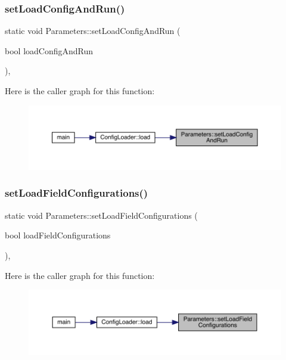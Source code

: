 \subsubsection{\texorpdfstring{setLoadConfigAndRun()}{setLoadConfigAndRun()}}
{\footnotesize\ttfamily static void Parameters\+::set\+Load\+Config\+And\+Run (\begin{DoxyParamCaption}\item[{bool}]{load\+Config\+And\+Run }\end{DoxyParamCaption})\hspace{0.3cm}{\ttfamily [inline]}, {\ttfamily [static]}}

Here is the caller graph for this function\+:
\nopagebreak
\begin{figure}[H]
\begin{center}
\leavevmode
\includegraphics[width=350pt]{class_parameters_aa7e911174ec1991f6750b9774b184fd3_icgraph}
\end{center}
\end{figure}
\mbox{\label{class_parameters_a4f96947340b496b847a808b8be6fc5f9}} 
\subsubsection{\texorpdfstring{setLoadFieldConfigurations()}{setLoadFieldConfigurations()}}
{\footnotesize\ttfamily static void Parameters\+::set\+Load\+Field\+Configurations (\begin{DoxyParamCaption}\item[{bool}]{load\+Field\+Configurations }\end{DoxyParamCaption})\hspace{0.3cm}{\ttfamily [inline]}, {\ttfamily [static]}}

Here is the caller graph for this function\+:
\nopagebreak
\begin{figure}[H]
\begin{center}
\leavevmode
\includegraphics[width=350pt]{class_parameters_a4f96947340b496b847a808b8be6fc5f9_icgraph}
\end{center}
\end{figure}
\mbox{\label{class_parameters_ace3967a0ee49901f55e9de69e0a96117}} 
